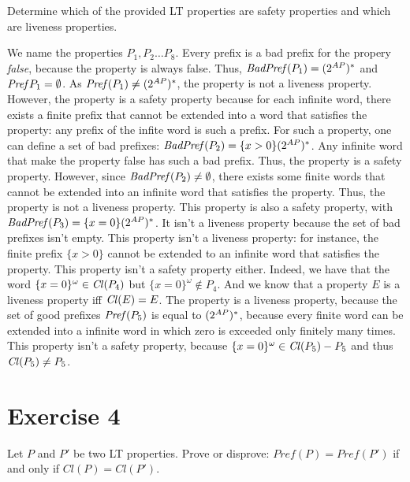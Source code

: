 \documentclass[11pt,a4paper]{article}
\begin{document}
Determine which of the provided LT properties are
safety properties and which are liveness properties. 

\begin{Answer}[number=3]
We name the properties $P_1, P_2\dots P_8$.
  \Question 
Every prefix is a bad prefix for the propery \textit{false}, because the property is always false. Thus, $\mathit{BadPref}(P_1) = (2^{AP})^*$ and $\mathit{Pref}{P_1} = \emptyset$. As $\mathit{Pref}(P_1)\neq (2^{AP})^*$, the property is not a liveness property. However, the property is a safety property because for each infinite word, there exists a finite prefix that cannot be extended into a word that satisfies the property: any prefix of the infite word is such a prefix.
  \Question
For such a property, one can define a set of bad prefixes: $\mathit{BadPref}(P_2) = \{x > 0\}(2^{AP})^*$. Any infinite word that make the property false has such a bad prefix. Thus, the property is a safety property. However, since $\mathit{BadPref}(P_2)\neq\emptyset$, there exists some finite words that cannot be extended into an infinite word that satisfies the property. Thus, the property is not a liveness property.
  \Question
This property is also a safety property, with $\mathit{BadPref}(P_3) = \{x=0\}(2^{AP})^*$. It isn't a liveness property because the set of bad prefixes isn't empty.
  \Question
This property isn't a liveness property: for instance, the finite prefix $\{x>0\}$ cannot be extended to an infinite word that satisfies the property.
This property isn't a safety property either. Indeed, we have that the word $\{x=0\}^\omega\in\mathit{Cl}(P_4)$ but $\{x=0\}^\omega\not\in P_4$. And we know that a property $E$ is a liveness property iff $\mathit{Cl}(E)=E$.
  \Question 
The property is a liveness property, because the set of good prefixes $\mathit{Pref}(P_5)$ is equal to $(2^{AP})^*$, because  every finite word can be extended into a infinite word in which zero is exceeded only finitely many times. This property isn't a safety property, because $\{x=0\}^\omega\in\mathit{Cl}(P_5)-P_5$ and thus $\mathit{Cl}(P_5)\neq P_5$.
  \Question%
  \Question%
  \Question%
\end{Answer}

\section*{Exercise 4}
Let $P$ and $P'$ be two LT properties. Prove or disprove: $Pref(P) = Pref(P')$ if and only if $Cl(P) = Cl(P')$.
\end{document}
